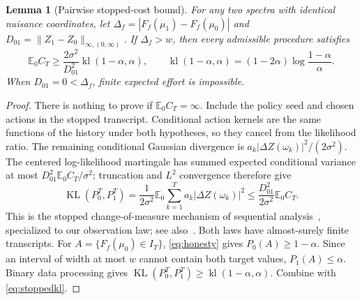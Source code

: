 \documentclass[10pt]{amsart}
\newtheorem{lemma}[theorem]{Lemma}
\theoremstyle{definition}
\theoremstyle{remark}
\theoremstyle{plain}
\newcommand{\E}{\mathbb E}
\newcommand{\KL}{\operatorname{KL}}
\newcommand{\kl}{\operatorname{kl}}
\begin{document}
\begin{lemma}[Pairwise stopped-cost bound]\label{lem:stopped}
For any two spectra with identical nuisance coordinates, let $\Delta_f=|F_f(\mu_1)-F_f(\mu_0)|$ and $D_{01}=\|Z_1-Z_0\|_{\infty,(0,\infty)}$. If $\Delta_f>w$, then every admissible procedure satisfies
\begin{equation}\label{eq:paircost}
 \E_0C_T\ge\frac{2\sigma^2}{D_{01}^2}\kl(1-\alpha,\alpha),\qquad
 \kl(1-\alpha,\alpha)=(1-2\alpha)\log\frac{1-\alpha}{\alpha}.
\end{equation}
When $D_{01}=0<\Delta_f$, finite expected effort is impossible.
\end{lemma}
\begin{proof}
There is nothing to prove if $\E_0C_T=\infty$. Include the policy seed and chosen actions in the stopped transcript. Conditional action kernels are the same functions of the history under both hypotheses, so they cancel from the likelihood ratio. The remaining conditional Gaussian divergence is $a_k|\Delta Z(\omega_k)|^2/(2\sigma^2)$. The centered log-likelihood martingale has summed expected conditional variance at most $D_{01}^2\E_0C_T/\sigma^2$; truncation and $L^2$ convergence therefore give
\begin{equation}\label{eq:stoppedkl}
 \KL(P_0^T,P_1^T)
 =\frac1{2\sigma^2}\E_0\sum_{k=1}^T a_k|\Delta Z(\omega_k)|^2
 \le\frac{D_{01}^2}{2\sigma^2}\E_0C_T.
\end{equation}
This is the stopped change-of-measure mechanism of sequential analysis~\cite[Lemma~1 and Appendix~A]{kaufmann}, specialized to our observation law; see also~\cite{castro}. Both laws have almost-surely finite transcripts. For $A=\{F_f(\mu_0)\in I_T\}$, \eqref{eq:honesty} gives $P_0(A)\ge1-\alpha$. Since an interval of width at most $w$ cannot contain both target values, $P_1(A)\le\alpha$. Binary data processing gives $\KL(P_0^T,P_1^T)\ge\kl(1-\alpha,\alpha)$. Combine with \eqref{eq:stoppedkl}.
\end{proof}
\end{document}
